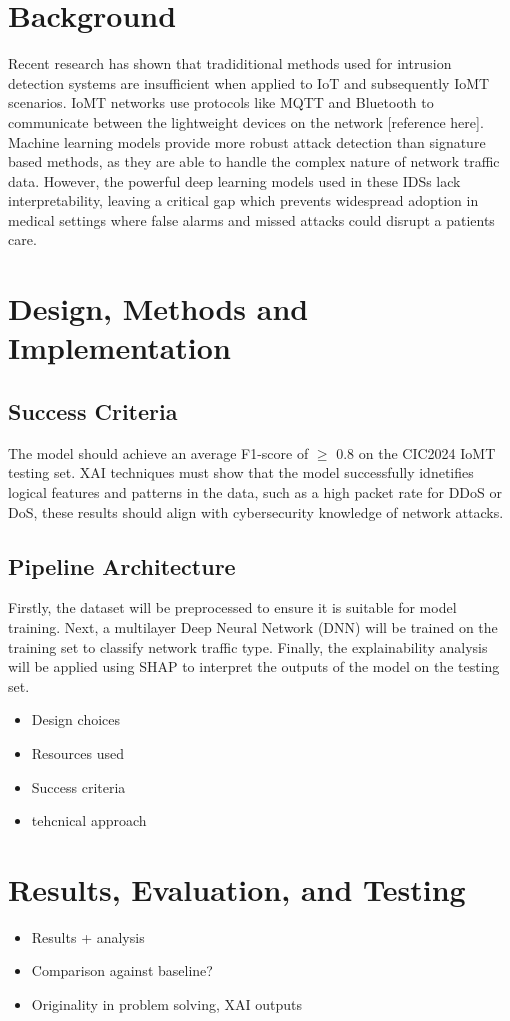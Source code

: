 \documentclass[11pt,a4paper]{article}
\begin{document}
\newpage
\section{Background}
Recent research has shown that tradiditional methods used for intrusion detection systems
are insufficient when applied to IoT and subsequently IoMT scenarios. IoMT networks use
protocols like MQTT and Bluetooth to communicate between the lightweight devices on
the network [reference here]. Machine learning models provide more robust attack
detection than signature based methods, as they are able to handle the complex nature
of network traffic data. However, the powerful deep learning models used in these IDSs
lack interpretability, leaving a critical gap which prevents widespread adoption in
medical settings where false alarms and missed attacks could disrupt a patients care.

\newpage
\section{Design, Methods and Implementation}
\subsection{Success Criteria}
The model should achieve an average F1-score of $\geq$ 0.8 on the CIC2024 IoMT testing
set. XAI techniques must show that the model successfully idnetifies logical features
and patterns in the data, such as a high packet rate for DDoS or DoS, these results
should align with cybersecurity knowledge of network attacks.
\subsection{Pipeline Architecture}
Firstly, the dataset will be preprocessed to ensure it is suitable for model training.
Next, a multilayer Deep Neural Network (DNN) will be trained on the training set to
classify network traffic type. Finally, the explainability analysis will be applied
using SHAP to interpret the outputs of the model on the testing set.
\begin{itemize}
    \item Design choices
    \item Resources used
    \item Success criteria
    \item tehcnical approach
\end{itemize}

\newpage
\section{Results, Evaluation, and Testing}
\begin{itemize}
    \item Results + analysis
    \item Comparison against baseline?
    \item Originality in problem solving, XAI outputs
\end{itemize}
\end{document}
